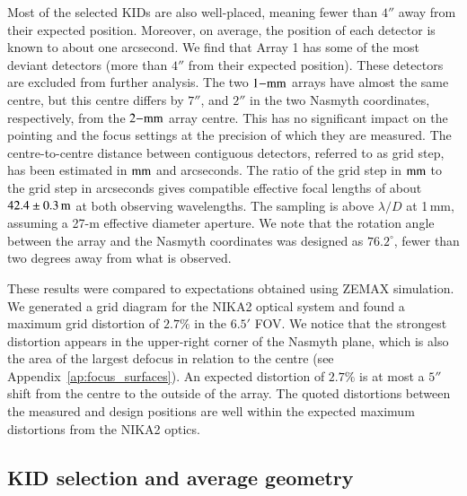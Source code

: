 \documentclass[traditionalabstract]{aa}
\newcommand{\lp}[1]{#1}
\newcommand{\LEt}[1]{{\bf {\color[RGB]{0, 153, 255} #1}}}
\begin{document}
{Most of the selected KIDs are also well-placed, meaning fewer than $4''$ away from
their expected position. Moreover, on average, the position of each
detector is known to about one arcsecond. We find
that Array 1 has some of the most deviant detectors (more than $4''$
from their expected position). These detectors are excluded from
further analysis. The two $1\rm{-mm}$ arrays have almost
the same centre, but this centre differs by $7''$, and $2''$ in the two Nasmyth
coordinates, respectively, from the $2\rm{-mm}$ array centre.
This has no significant impact on the pointing and the focus settings
at the precision of which they are measured.
{\lp The centre-to-centre distance between
contiguous detectors, referred to as grid step, has been estimated in
$\rm{mm}$ and arcseconds. %
The ratio of the grid step in $\rm{mm}$ to
the grid step in arcseconds gives compatible effective focal lengths
of about $42.4\pm0.3\,\rm{m}$ at both observing wavelengths.} The sampling is above $\lambda/D$ at
1\,mm, assuming a 27-m effective diameter aperture. We note that
the rotation angle between the array and the Nasmyth
coordinates was designed as $76.2^{\circ}$, fewer than two degrees
away from what is observed.


These results were compared to expectations obtained using ZEMAX
simulation. We generated a grid diagram for the NIKA2 optical system and found a maximum
grid distortion of $2.7\%$ in the $6.5'$ FOV. We notice that the
strongest distortion appears in the upper-right corner of the Nasmyth plane, which is
also the area of the largest defocus in relation to the centre (see Appendix~\ref{ap:focus_surfaces}).
An expected distortion of $2.7\%$ is at most a $5''$ shift from the
centre to the outside of the array. The quoted distortions between the
measured and design positions are well within the expected
maximum distortions from the NIKA2 optics.

\subsection{KID selection and average geometry}
\label{se:avg_kidpar}

}
\end{document}
